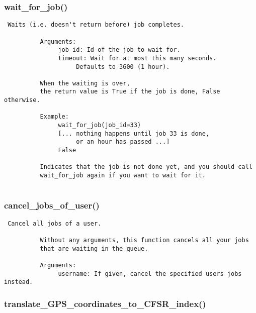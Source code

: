 \subsubsection{wait\_for\_job()}


\begin{verbatim}
 Waits (i.e. doesn't return before) job completes.
     
          Arguments:
               job_id: Id of the job to wait for.
               timeout: Wait for at most this many seconds.
                    Defaults to 3600 (1 hour).
          
          When the waiting is over, 
          the return value is True if the job is done, False otherwise. 
          
          Example:
               wait_for_job(job_id=33)
               [... nothing happens until job 33 is done,
                    or an hour has passed ...]
               False

          Indicates that the job is not done yet, and you should call
          wait_for_job again if you want to wait for it.
          
\end{verbatim}
\subsubsection{cancel\_jobs\_of\_user()}


\begin{verbatim}
 Cancel all jobs of a user.
          
          Without any arguments, this function cancels all your jobs
          that are waiting in the queue.

          Arguments:
               username: If given, cancel the specified users jobs instead. 
\end{verbatim}
\subsubsection{translate\_GPS\_coordinates\_to\_CFSR\_index()}


